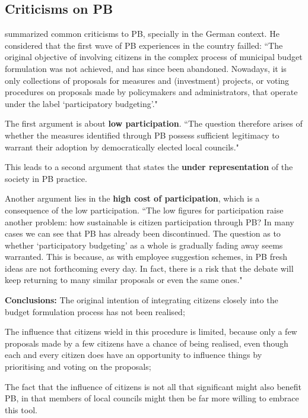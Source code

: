 \subsection{Criticisms on PB}

 summarized common criticisms to PB, specially in the German context. He considered that the first wave of PB experiences in the country failled: ``The original objective of involving citizens in the complex process of municipal budget formulation was not achieved, and has since been abandoned. Nowadays, it is only collections of proposals for measures and (investment) projects, or voting procedures on proposals made by policymakers and administrators, that operate under the label ‘participatory budgeting’."

The first argument is about \textbf{low participation}. ``The question therefore arises of whether the measures identified through PB possess sufficient legitimacy to warrant their adoption by democratically elected local councils."

This leads to a second argument that states the \textbf{under representation} of the society in PB practice.

Another argument lies in the \textbf{high cost of participation}, which is a consequence of the low participation. ``The low figures for participation raise another problem:  how sustainable is citizen participation through PB? In many cases we can see that PB has already been discontinued. The question as to whether ‘participatory budgeting’ as a whole is gradually fading away seems warranted. This is because, as with employee suggestion schemes, in PB fresh ideas are not forthcoming every day. In fact, there is a risk that the debate will keep returning to many similar proposals or even the same ones."

\textbf{Conclusions:}
The original intention of integrating citizens closely into the budget formulation process has not been realised;

The influence that citizens wield in this procedure is limited, because only a few proposals made by a few citizens have a chance of being realised, even though each and every citizen does have an opportunity to influence things by prioritising and voting on the proposals;

The fact that the influence of citizens is not all that significant might also benefit PB, in that members of local councils might then be far more willing to embrace this tool. 

